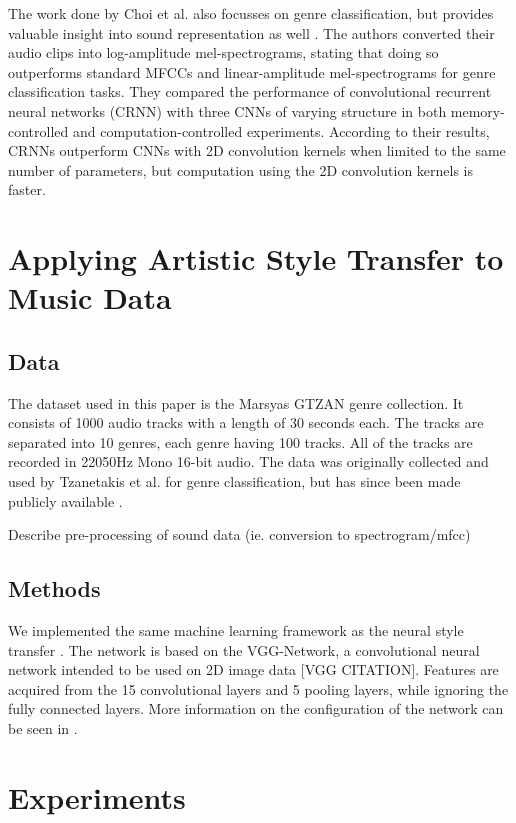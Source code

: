 \documentclass{article}
\begin{document}
The work done by Choi et al. also focusses on genre classification, but provides valuable insight into sound representation as well \citep{Choi2016}. The authors converted their audio clips into log-amplitude mel-spectrograms, stating that doing so outperforms standard MFCCs and linear-amplitude mel-spectrograms for genre classification tasks. They compared the performance of convolutional recurrent neural networks (CRNN) with three CNNs of varying structure in both memory-controlled and computation-controlled experiments. According to their results, CRNNs outperform CNNs with 2D convolution kernels when limited to the same number of parameters, but computation using the 2D convolution kernels is faster.

\section{Applying Artistic Style Transfer to Music Data}

\subsection{Data}

The dataset used in this paper is the Marsyas GTZAN genre collection. It consists of 1000 audio tracks with a length of 30 seconds each. The tracks are separated into 10 genres, each genre having 100 tracks. All of the tracks are recorded in 22050Hz Mono 16-bit audio. The data was originally collected and used by Tzanetakis et al. for genre classification, but has since been made publicly available \citep{Tzanetakis2002}.

Describe pre-processing of sound data (ie. conversion to spectrogram/mfcc)


\subsection{Methods}

We implemented the same machine learning framework as the neural style transfer \cite{Gatys2015}. The network is based on the VGG-Network, a convolutional neural network intended to be used on 2D image data [VGG CITATION]. Features are acquired from the 15 convolutional layers and 5 pooling layers, while ignoring the fully connected layers. More information on the configuration of the network can be seen in \citep{Gatys2015}.

\section{Experiments}
\end{document}
